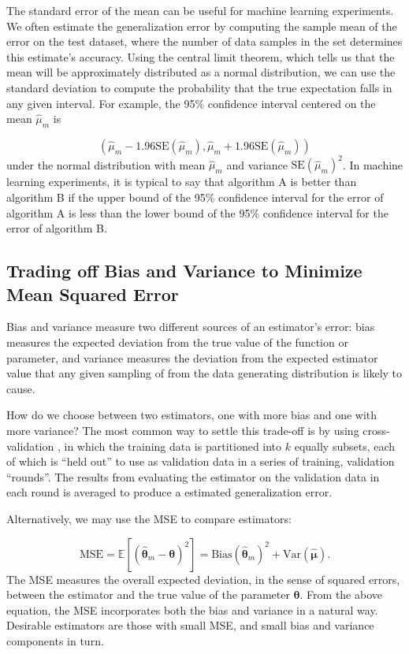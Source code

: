 The standard error of the mean can be useful for machine learning experiments. We often estimate the generalization error by computing the sample mean of the error on the test dataset, where the number of data samples in the set determines this estimate's accuracy. Using the central limit theorem, which tells us that the mean will be approximately distributed as a normal distribution, we can use the standard deviation to compute the probability that the true expectation falls in any given interval. For example, the 95\% confidence interval centered on the mean $\hat\mu_m$ is

\begin{equation}
(\hat\mu_m - 1.96 \text{SE}(\hat\mu_m),\hat\mu_m + 1.96 \text{SE}(\hat\mu_m))
\end{equation}
under the normal distribution with mean $\hat\mu_m$ and variance $\text{SE}(\hat\mu_m)^2$. In machine learning experiments, it is typical to say that algorithm A is better than algorithm B if the upper bound of the 95\% confidence interval for the error of algorithm A is less than the lower bound of the 95\% confidence interval for the error of algorithm B.


\subsection{Trading off Bias and Variance to Minimize Mean Squared Error}

Bias and variance measure two different sources of an estimator's error: bias measures the expected deviation from the true value of the function or parameter, and variance measures the deviation from the expected estimator value that any given sampling of from the data generating distribution is likely to cause.

How do we choose between two estimators, one with more bias and one with more variance? The most common way to settle this trade-off is by using cross-validation \cite{wikipediaCrossvalidation2019}, in which the training data is partitioned into $k$ equally subsets, each of which is ``held out'' to use as validation data in a series of training, validation ``rounds''. The results from evaluating the estimator on the validation data in each round is averaged to produce a estimated generalization error.

Alternatively, we may use the \ac{MSE} to compare estimators:

\begin{equation}
\text{MSE} = \mathbb{E}[(\boldsymbol{\hat\theta}_m - \boldsymbol{\theta})^2]
= \text{Bias}(\boldsymbol{\hat\theta}_m)^2 + \text{Var}(\boldsymbol{\hat\mu}).
\end{equation}
The \ac{MSE} measures the overall expected deviation, in the sense of squared errors, between the estimator and the true value of the parameter $\boldsymbol{\theta}$. From the above equation, the \ac{MSE} incorporates both the bias and variance in a natural way. Desirable estimators are those with small \ac{MSE}, and small bias and variance components in turn.

